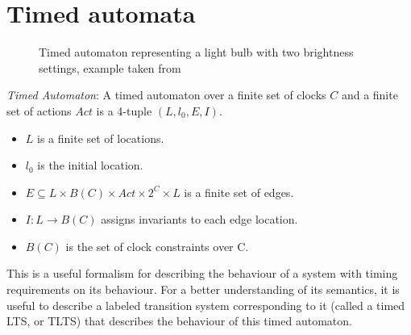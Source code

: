 \section{Timed automata}

\begin{SCfigure}
  \centering

  \caption{Timed automaton representing a light bulb with two
    brightness settings, example taken from \cite{aceto2007reactive}}
\end{SCfigure}

\begin{definition}
  \emph{Timed Automaton}: A timed automaton
  \cite{Alur94atheory} over a finite set of clocks $C$
  and a finite set of actions $Act$ is a 4-tuple $(L, l_{0}, E, I)$.
  \begin{itemize}
  \item $L$ is a finite set of locations.
  \item $l_{0}$ is the initial location.
  \item $E \subseteq L \times B(C) \times Act \times 2^{C} \times L$
    is a finite set of edges.
  \item $I: L \rightarrow B(C)$ assigns invariants to each edge
    location.
  \item $B(C)$ is the set of clock constraints over C.
  \end{itemize}
\end{definition}

This is a useful formalism for describing the behaviour of a system
with timing requirements on its behaviour. For a better understanding
of its semantics, it is useful to describe a labeled transition system
corresponding to it (called a timed LTS, or TLTS) that describes the
behaviour of this timed automaton.

